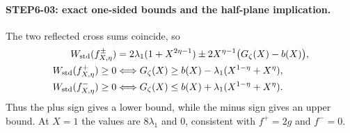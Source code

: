 \documentclass[11pt,a4paper]{article}
\begin{document}
\paragraph{STEP6-03: exact one-sided bounds and the half-plane implication.}
The two reflected cross sums coincide, so
\begin{align}
 W_{\rm std}(f^\pm_{X,\eta})
 &=2\lambda_1(1+X^{2\eta-1})
   \pm2X^{\eta-1}\bigl(G_\zeta(X)-b(X)\bigr),\label{eq:WeilGz}\\
 W_{\rm std}(f^+_{X,\eta})\ge0
 &\Longleftrightarrow G_\zeta(X)\ge b(X)-\lambda_1(X^{1-\eta}+X^\eta),\label{eq:WeilLower}\\
 W_{\rm std}(f^-_{X,\eta})\ge0
 &\Longleftrightarrow G_\zeta(X)\le b(X)+\lambda_1(X^{1-\eta}+X^\eta).\label{eq:WeilUpper}
\end{align}
Thus the plus sign gives a lower bound, while the minus sign gives an upper bound. At $X=1$ the values are $8\lambda_1$ and $0$, consistent with $f^+=2g$ and $f^-=0$.
\end{document}
